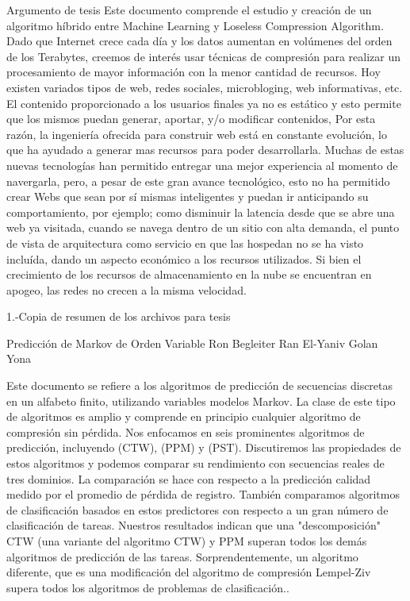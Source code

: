 Argumento de tesis
Este documento comprende el estudio y creación de un algoritmo híbrido entre Machine Learning y Loseless Compression Algorithm. Dado que  Internet crece cada día y los datos aumentan en volúmenes del orden de los Terabytes, creemos de interés usar técnicas de compresión para realizar un procesamiento de mayor información con la menor cantidad de recursos.
Hoy existen variados tipos de web, redes sociales, microbloging, web informativas, etc. El contenido proporcionado a los usuarios finales  ya no es estático y esto permite que los mismos puedan generar, aportar, y/o modificar contenidos, Por esta razón, la ingeniería ofrecida para construir web está en constante evolución, lo que ha ayudado a generar mas recursos para poder desarrollarla. 
Muchas de estas nuevas tecnologías han permitido entregar una mejor experiencia al momento de navergarla, pero, a pesar de este gran avance tecnológico, esto no ha permitido crear Webs que sean por sí mismas inteligentes y puedan ir anticipando su comportamiento,  por ejemplo;  como disminuir la latencia desde que se abre una web ya visitada,  cuando se navega dentro de un sitio con alta demanda,  el punto de vista de  arquitectura como servicio en que las hospedan no se ha visto incluída, dando un aspecto económico a los recursos utilizados. Si bien el crecimiento de los recursos de almacenamiento en la nube se encuentran en apogeo, las redes no crecen a la misma velocidad. 




1.-Copia de resumen de los archivos para tesis

Predicción de Markov de Orden Variable
Ron Begleiter
Ran El-Yaniv
Golan Yona

Este documento se refiere a los algoritmos de predicción de secuencias discretas en un alfabeto finito, utilizando variables modelos Markov. La clase de este tipo de algoritmos es amplio y comprende en principio cualquier algoritmo de compresión sin pérdida. Nos enfocamos en seis prominentes algoritmos de predicción, incluyendo  (CTW), (PPM) y (PST).  Discutiremos las propiedades de estos algoritmos y podemos comparar su rendimiento con secuencias reales de tres dominios.
La comparación se hace con respecto a la predicción calidad medido por el promedio de pérdida de registro. También comparamos algoritmos de clasificación basados en estos predictores con respecto a un gran número de clasificación de  tareas. Nuestros resultados indican que una "descomposición" CTW (una variante del algoritmo CTW) y PPM superan todos los demás algoritmos de predicción de las tareas. Sorprendentemente, un algoritmo diferente, que es una modificación del algoritmo de compresión Lempel-Ziv supera todos los algoritmos de  problemas de clasificación..


